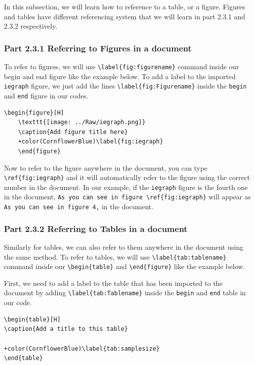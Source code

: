 \documentclass[12pts]{report}
\begin{document}
In this subsection, we will learn how to reference to a table, or a figure. Figures and tables have different referencing system that we will learn in part 2.3.1 and 2.3.2 respectively.

\subsubsection*{Part 2.3.1 Referring to Figures in a document}
To refer to figures, we will use \verb|\label{fig:figurename}| command inside our begin and end figure like the example below. 
To add a label to the imported \texttt{iegraph} figure, we just add the lines \verb|\label{fig:Figurename}| inside the \texttt{begin} and \texttt{end} figure in our codes. 

\begin{Verbatim}[commandchars=+\(\)]
	\begin{figure}[H]
	\texttt{[image: ../Raw/iegraph.png]}
	\caption{Add figure title here}
	+color(CornflowerBlue)\label{fig:iegraph}
	\end{figure}
\end{Verbatim}

Now to refer to the figure anywhere in the document, you can type \verb|\ref{fig:iegraph}| and it will automatically refer to the figure using the correct number in the document. In our example, if the \texttt{iegraph}	figure is the fourth one in the document, \verb|As you can see in figure \ref{fig:iegraph}| will appear as \texttt{As you can see in figure 4,} in the document. 

\subsubsection*{Part 2.3.2 Referring to Tables in a document}

Similarly for tables, we can also refer to them anywhere in the document using the same method. To refer to tables, we will use \verb|\label{tab:tablename}| command inside our \verb|\begin{table}| and \verb|\end{figure}| like the example below. 

First, we need to add a label to the table that has been imported to the document by adding \verb|\label{tab:Tablename}| inside the \texttt{begin} and \texttt{end} table in our code. 

\begin{Verbatim}[commandchars=+\(\)]
\begin{table}[H]
\caption{Add a title to this table}

+color(CornflowerBlue)\label{tab:samplesize}
\end{table}
\end{Verbatim}
\end{document}
